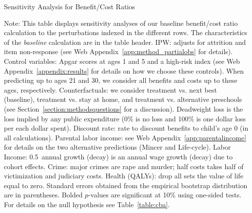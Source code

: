 \begin{table}
\begin{threeparttable}
\caption{Sensitivity Analysis for Benefit/Cost Ratios}
\label{table:bcsens}
\centering
\scriptsize

\begin{tablenotes}
\scriptsize
\item Note: This table displays sensitivity analyses of our baseline benefit/cost ratio calculation to the perturbations indexed in the different rows. The characteristics of the \textit{baseline} calculation are in the table header. IPW: adjusts for attrition and item non-response (see Web Appendix~\ref{app:method_partialobs} for details). Control variables: Apgar scores at ages 1 and 5 and a high-risk index (see Web Appendix~\ref{appendix:results} for details on how we choose these controls). When predicting up to ages 21 and 30, we consider all benefits and costs up to these ages, respectively. Counterfactuals: we consider treatment vs. next best (baseline), treatment vs. stay at home, and treatment vs. alternative preschools (see Section~\ref{section:methodsquestions} for a discussion). Deadweight loss is the loss implied by any public expenditure (0\% is no loss and 100\% is one dollar loss per each dollar spent). Discount rate: rate to discount benefits to child's age 0 (in all calculations). Parental labor income: see Web Appendix~\ref{app:parentalincome} for details on the two alternative predictions (Mincer and Life-cycle). Labor Income: 0.5\ annual growth (decay) is an annual wage growth (decay) due to cohort effects. Crime: major crimes are rape and murder; half costs takes half of victimization and judiciary costs. Health (QALYs): drop all sets the value of life equal to zero. Standard errors obtained from the empirical bootstrap distribution are in parentheses. Bolded $p$-values are significant at 10\% using one-sided tests. For details on the null hypothesis see Table~\ref{table:cba}.
\end{tablenotes}
\end{threeparttable}
\end{table}

